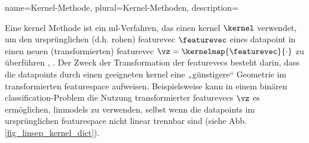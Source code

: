{{{{
{name={Kernel-Methode}, 
plural={Kernel-Methoden}, 
	description={Eine \gls{kernel} Methode ist ein \gls{ml}-Verfahren, das einen 
		\gls{kernel} $\kernel$ verwendet, um den ursprünglichen (d.h. rohen) \gls{featurevec} $\featurevec$ eines 
		\gls{datapoint} in einen neuen (transformierten) \gls{featurevec} $\vz = \kernelmap{\featurevec}{\cdot}$ zu überführen \cite{LearningKernelsBook}, \cite{LampertNowKernel}.
		Der Zweck der Transformation der \glspl{featurevec} besteht darin, dass die \glspl{datapoint} durch einen geeigneten \gls{kernel} eine „günstigere“ Geometrie im transformierten \gls{featurespace} aufweisen. 
		Beispielsweise kann in einem binären \gls{classification}-Problem die Nutzung transformierter \glspl{featurevec} $\vz$ 
		es ermöglichen, \glspl{linmodel} zu verwenden, selbst wenn die \glspl{datapoint} im ursprünglichen \gls{featurespace} nicht linear trennbar sind (siehe Abb. \ref{fig_linsep_kernel_dict}). 
\begin{figure}[H]
\begin{center}
\end{center}
\end{figure}}}}}}}

